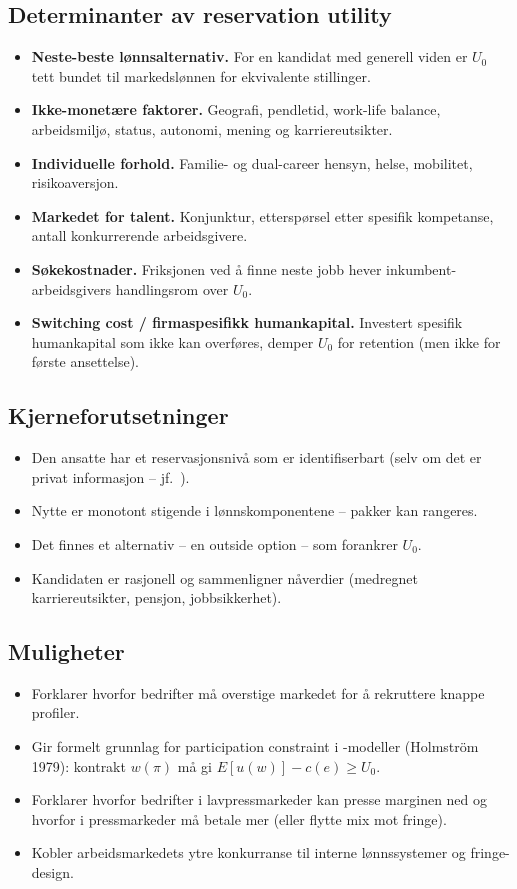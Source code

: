 \subsection*{Determinanter av reservation utility}
\begin{itemize}
\item \textbf{Neste-beste lønnsalternativ.} For en kandidat med generell viden er $U_0$ tett bundet til markedslønnen for ekvivalente stillinger.
\item \textbf{Ikke-monetære faktorer.} Geografi, pendletid, work-life balance, arbeidsmiljø, status, autonomi, mening og karriereutsikter.
\item \textbf{Individuelle forhold.} Familie- og dual-career hensyn, helse, mobilitet, risikoaversjon.
\item \textbf{Markedet for talent.} Konjunktur, etterspørsel etter spesifik kompetanse, antall konkurrerende arbeidsgivere.
\item \textbf{Søkekostnader.} Friksjonen ved å finne neste jobb hever inkumbent-arbeidsgivers handlingsrom over $U_0$.
\item \textbf{Switching cost / firmaspesifikk humankapital.} Investert spesifik humankapital som ikke kan overføres, demper $U_0$ for retention (men ikke for første ansettelse).
\end{itemize}

\subsection*{Kjerneforutsetninger}
\begin{itemize}
\item Den ansatte har et reservasjonsnivå som er identifiserbart (selv om det er privat informasjon -- jf.\ ).
\item Nytte er monotont stigende i lønnskomponentene -- pakker kan rangeres.
\item Det finnes et alternativ -- en outside option -- som forankrer $U_0$.
\item Kandidaten er rasjonell og sammenligner nåverdier (medregnet karriereutsikter, pensjon, jobbsikkerhet).
\end{itemize}

\subsection*{Muligheter}
\begin{itemize}
\item Forklarer hvorfor bedrifter må overstige markedet for å rekruttere knappe profiler.
\item Gir formelt grunnlag for participation constraint i -modeller (Holmström 1979): kontrakt $w(\pi)$ må gi $E[u(w)] - c(e) \geq U_0$.
\item Forklarer hvorfor bedrifter i lavpressmarkeder kan presse marginen ned og hvorfor i pressmarkeder må betale mer (eller flytte mix mot fringe).
\item Kobler arbeidsmarkedets ytre konkurranse til interne lønnssystemer og fringe-design.
\end{itemize}

